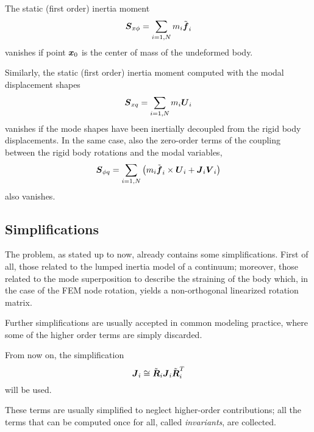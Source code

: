 The static (first order) inertia moment
\begin{equation}
	\boldsymbol{S}_{x\phi} = \sum_{i=1,N} m_i \tilde{\boldsymbol{f}}_i
\end{equation}
vanishes if point $\boldsymbol{x}_0$ is the center of mass of the undeformed body.

Similarly, the static (first order) inertia moment computed with 
the modal displacement shapes
\begin{equation}
	\boldsymbol{S}_{xq} = \sum_{i=1,N} m_i \boldsymbol{U}_i
\end{equation}
vanishes if the mode shapes have been inertially decoupled
from the rigid body displacements.
In the same case, also the zero-order terms of the coupling
between the rigid body rotations and the modal variables,
\begin{equation}
	\boldsymbol{S}_{\phi q} = \sum_{i=1,N} \left( 
		m_i \tilde{\boldsymbol{f}}_i \times \boldsymbol{U}_i
		+ \boldsymbol{J}_i \boldsymbol{V}_i
	 \right)
\end{equation}
also vanishes.

\subsection{Simplifications}
The problem, as stated up to now, already contains some simplifications.
First of all, those related to the lumped inertia model of a continuum;
moreover, those related to the mode superposition to describe the
straining of the body which, in the case of the FEM node rotation,
yields a non-orthogonal linearized rotation matrix.

Further simplifications are usually accepted in common modeling practice,
where some of the higher order terms are simply discarded.

From now on, the simplification
\begin{equation}
	\boldsymbol{J}_i \cong \tilde{\boldsymbol{R}}_i \boldsymbol{J}_i \tilde{\boldsymbol{R}}_i^T
\end{equation}
will be used.

These terms are usually simplified to neglect higher-order contributions;
all the terms that can be computed once for all, called \emph{invariants},
are collected.


